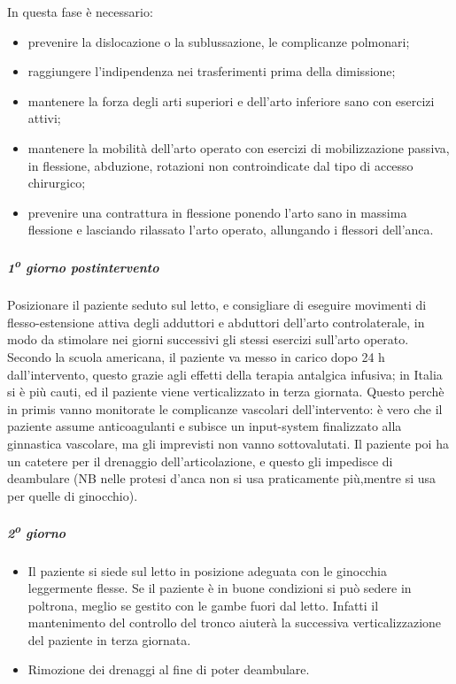 In questa fase è necessario:
\begin{itemize}
\item prevenire la dislocazione o la sublussazione, le complicanze polmonari;
\item raggiungere l'indipendenza nei trasferimenti prima della dimissione;
\item mantenere la forza degli arti superiori e dell'arto inferiore sano con esercizi attivi;
\item mantenere la mobilità dell'arto operato con esercizi di mobilizzazione passiva, in flessione, abduzione, rotazioni non controindicate dal tipo di accesso chirurgico;
\item prevenire una contrattura in flessione ponendo l'arto sano in massima flessione e lasciando rilassato l'arto operato, allungando i flessori dell'anca.
\end{itemize}

\subparagraph{1\textsuperscript{o} giorno postintervento}

Posizionare il paziente seduto sul letto, e consigliare di eseguire movimenti di flesso-estensione attiva degli adduttori e abduttori dell'arto controlaterale, in modo da stimolare nei giorni successivi gli stessi esercizi sull'arto operato. Secondo la scuola americana, il paziente va messo in carico dopo 24 h dall'intervento, questo grazie agli effetti della terapia antalgica infusiva; in Italia si è più cauti, ed il paziente viene verticalizzato in terza giornata. Questo perchè in primis vanno monitorate le complicanze vascolari dell'intervento: è vero che il paziente assume anticoagulanti e subisce un input-system
finalizzato alla ginnastica vascolare, ma gli imprevisti non vanno sottovalutati. Il paziente poi ha un catetere per il drenaggio dell'articolazione, e questo gli impedisce di deambulare (NB nelle protesi d'anca non si usa praticamente più,mentre si usa per quelle di ginocchio).

\subparagraph{2\textsuperscript{o} giorno}
\begin{itemize}
\item Il paziente si siede sul letto in posizione adeguata con le ginocchia leggermente flesse. Se il paziente è in buone condizioni si può sedere in poltrona, meglio se gestito con le gambe fuori dal letto. Infatti il
mantenimento del controllo del tronco aiuterà la successiva
verticalizzazione del paziente in terza giornata.
\item Rimozione dei drenaggi al fine di poter deambulare.
\end{itemize}

